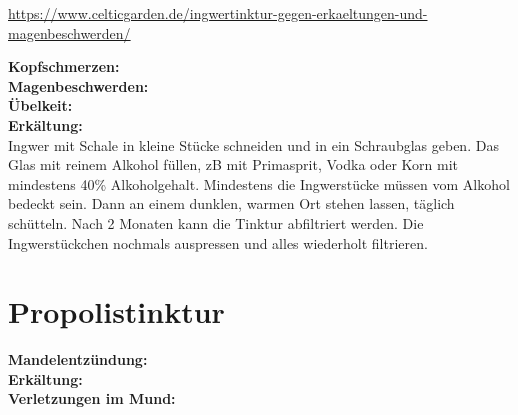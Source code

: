 
\url{https://www.celticgarden.de/ingwertinktur-gegen-erkaeltungen-und-magenbeschwerden/}

   


\textbf{Kopfschmerzen:} \\ 

\textbf{Magenbeschwerden:} \\ 

\textbf{Übelkeit:} \\ 

\textbf{Erkältung:} \\ 




Ingwer mit Schale in kleine Stücke schneiden und in ein Schraubglas geben. Das Glas mit reinem Alkohol füllen, zB mit Primasprit, Vodka oder Korn mit mindestens 40\% Alkoholgehalt. Mindestens die Ingwerstücke müssen vom Alkohol bedeckt sein. Dann an einem dunklen, warmen Ort stehen lassen, täglich schütteln. Nach 2 Monaten kann die Tinktur abfiltriert werden. Die Ingwerstückchen nochmals auspressen und alles wiederholt filtrieren.




\newpage


\section{Propolistinktur}
\label{   }


  

\textbf{Mandelentzündung:} \\

\textbf{Erkältung:} \\ 

\textbf{Verletzungen im Mund:} \\





